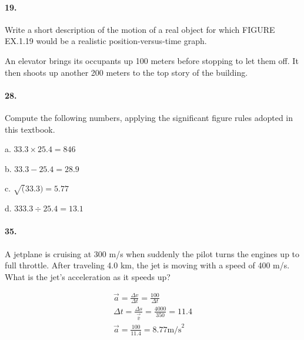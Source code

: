     \begin{multicols*}{2}
        \paragraph*{19.}
        Write a short description of the motion of a real object for which FIGURE EX.1.19 would be a realistic position-versus-time graph.

        \begin{mdframed}
            An elevator brings its occupants up 100 meters before stopping to let them off. It then shoots up another 200 meters to the top story of the building.
        \end{mdframed}

        \paragraph*{28.}
        Compute the following numbers, applying the significant figure rules adopted in this textbook.

        \begin{mdframed}
            a. $33.3 \times 25.4 = \boxed{846}$

            b. $33.3 - 25.4 = \boxed{28.9}$

            c. $\sqrt(33.3) = \boxed{5.77}$

            d. $333.3 \div 25.4 = \boxed{13.1}$
        \end{mdframed}

        \paragraph*{35.}
        A jetplane is cruising at 300 m/s when suddenly the pilot turns the engines up to full throttle. After traveling 4.0 km, the jet is moving with a speed of 400 m/s. What is the jet's acceleration as it speeds up?

        \begin{mdframed}
            \begin{equation*}
                \begin{gathered}
                    \vec{a} = \frac{\Delta v}{\Delta t} = \frac{100}{\Delta t}  \\
                    \Delta t = \frac{\Delta s}{\vec{\overline{v}}} = \frac{4000}{350} = 11.4    \\
                    \vec{a} = \frac{100}{11.4} = \boxed{8.77 \text{m/s}^2}
                \end{gathered}
            \end{equation*}
        \end{mdframed}


\end{multicols*}
